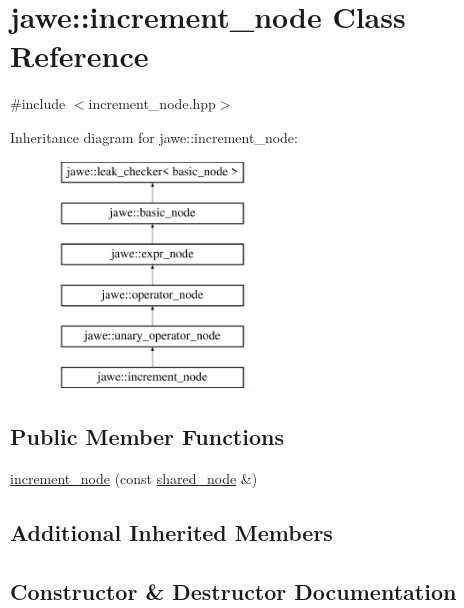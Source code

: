 \hypertarget{classjawe_1_1increment__node}{}\section{jawe\+:\+:increment\+\_\+node Class Reference}
\label{classjawe_1_1increment__node}


{\ttfamily \#include $<$increment\+\_\+node.\+hpp$>$}

Inheritance diagram for jawe\+:\+:increment\+\_\+node\+:\begin{figure}[H]
\begin{center}
\leavevmode
\includegraphics[height=6.000000cm]{classjawe_1_1increment__node}
\end{center}
\end{figure}
\subsection*{Public Member Functions}
\begin{DoxyCompactItemize}
\item 
\hyperlink{classjawe_1_1increment__node_a0ce8468ca62d09ee1b7d5ffbb37531ae}{increment\+\_\+node} (const \hyperlink{namespacejawe_a3f307481d921b6cbb50cc8511fc2b544}{shared\+\_\+node} \&)
\end{DoxyCompactItemize}
\subsection*{Additional Inherited Members}


\subsection{Constructor \& Destructor Documentation}
\mbox{\label{classjawe_1_1increment__node_a0ce8468ca62d09ee1b7d5ffbb37531ae}} 
